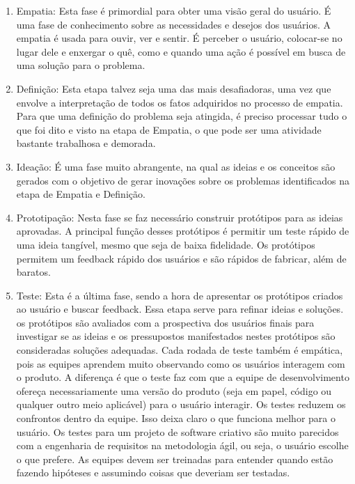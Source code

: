 \documentclass[conference]{IEEEtran}
\begin{document}
\begin{enumerate}

\item Empatia: Esta fase é primordial para obter uma visão geral do usuário. É uma fase de conhecimento sobre as  necessidades e desejos dos usuários. A empatia é usada para ouvir, ver e sentir. É perceber o usuário, colocar-se no lugar dele e enxergar o quê, como e quando uma ação é possível em busca de uma solução para o problema.

\item Definição: Esta etapa talvez seja uma das mais desafiadoras, uma vez que envolve a interpretação de todos os fatos adquiridos no processo de empatia. Para que uma definição do problema seja atingida, é preciso processar tudo o que foi dito e visto na etapa de Empatia, o que pode ser uma atividade bastante trabalhosa e demorada.

\item Ideação: É uma fase muito abrangente, na qual as ideias e os conceitos são gerados com o objetivo de gerar inovações sobre os problemas identificados na etapa de Empatia e Definição. 

\item Prototipação: Nesta fase se faz necessário construir protótipos para as ideias aprovadas. A principal função desses protótipos é permitir um teste rápido de uma ideia tangível, mesmo que seja de baixa fidelidade. Os protótipos permitem um feedback rápido dos usuários e são rápidos de fabricar, além de baratos.
    
\item Teste: Esta é a última fase, sendo a hora de apresentar os protótipos criados ao usuário e buscar feedback. Essa etapa serve para refinar ideias e soluções. os protótipos são avaliados com a prospectiva dos usuários finais para investigar se as ideias e os pressupostos manifestados nestes protótipos são consideradas soluções adequadas. Cada rodada de teste também é empática, pois as equipes aprendem muito observando como os usuários interagem com o produto. A diferença é que o teste faz com que a equipe de desenvolvimento ofereça necessariamente uma versão do produto (seja em papel, código ou qualquer outro meio aplicável) para o usuário interagir. Os testes reduzem os confrontos dentro da equipe. Isso deixa claro o que funciona melhor para o usuário. Os testes para um projeto de software criativo são muito parecidos com a engenharia de requisitos na metodologia ágil, ou seja, o usuário escolhe o que prefere. As equipes devem ser treinadas para entender quando estão fazendo hipóteses e assumindo coisas que deveriam ser testadas. 

\end{enumerate}
\end{document}
